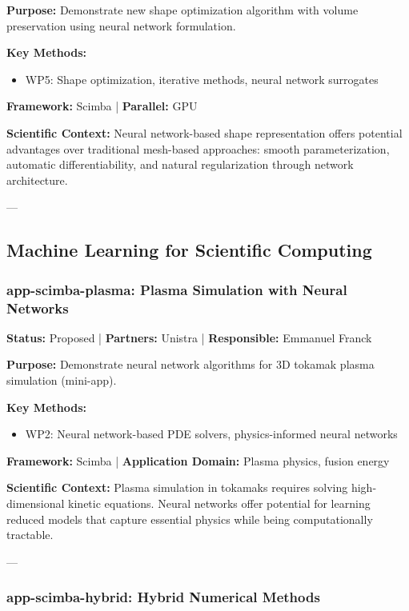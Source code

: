 \textbf{Purpose:} Demonstrate new shape optimization algorithm with volume preservation using neural network formulation.

\textbf{Key Methods:}
\begin{itemize}
\item WP5: Shape optimization, iterative methods, neural network surrogates
\end{itemize}

\textbf{Framework:} Scimba | \textbf{Parallel:} GPU

\textbf{Scientific Context:} Neural network-based shape representation offers potential advantages over traditional mesh-based approaches: smooth parameterization, automatic differentiability, and natural regularization through network architecture.

---

\subsection{Machine Learning for Scientific Computing}

\subsubsection{app-scimba-plasma: Plasma Simulation with Neural Networks}
\label{sec:app:specs:app-scimba-plasma}

\textbf{Status:} Proposed | \textbf{Partners:} Unistra | \textbf{Responsible:} Emmanuel Franck

\textbf{Purpose:} Demonstrate neural network algorithms for 3D tokamak plasma simulation (mini-app).

\textbf{Key Methods:}
\begin{itemize}
\item WP2: Neural network-based PDE solvers, physics-informed neural networks
\end{itemize}

\textbf{Framework:} Scimba | \textbf{Application Domain:} Plasma physics, fusion energy

\textbf{Scientific Context:} Plasma simulation in tokamaks requires solving high-dimensional kinetic equations. Neural networks offer potential for learning reduced models that capture essential physics while being computationally tractable.

---

\subsubsection{app-scimba-hybrid: Hybrid Numerical Methods}
\label{sec:app:specs:app-scimba-hybrid}

